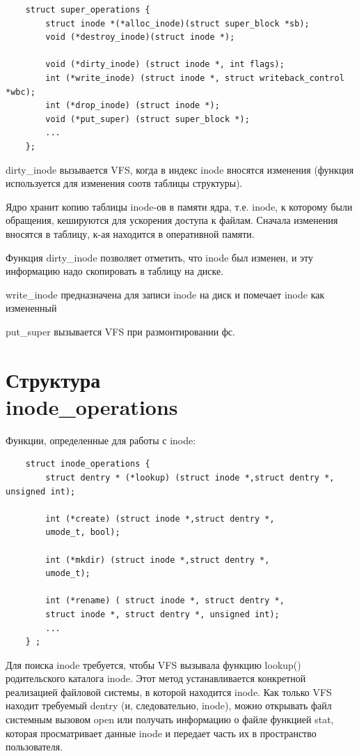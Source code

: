 \begin{lstlisting}
	struct super_operations {
		struct inode *(*alloc_inode)(struct super_block *sb);
		void (*destroy_inode)(struct inode *);
		
		void (*dirty_inode) (struct inode *, int flags);
		int (*write_inode) (struct inode *, struct writeback_control *wbc);
		int (*drop_inode) (struct inode *);
		void (*put_super) (struct super_block *);
		...
	};
\end{lstlisting}

dirty\_inode вызывается VFS, когда в индекс inode вносятся изменения (функция используется для изменения соотв таблицы структуры).

Ядро хранит копию таблицы inode-ов в памяти ядра, т.е. inode, к которому были обращения, кешируются для ускорения доступа к файлам. Сначала изменения вносятся в таблицу, к-ая находится в оперативной памяти.

Функция dirty\_inode позволяет отметить, что inode был изменен, и эту информацию надо скопировать в таблицу на диске.

write\_inode предназначена для записи inode на диск и помечает inode как измененный

put\_super вызывается VFS при размонтировании фс.


\section{Структура \\ inode\_operations}
Функции, определенные для работы с inode:
\begin{lstlisting}
	struct inode_operations {
		struct dentry * (*lookup) (struct inode *,struct dentry *, unsigned int);
		
		int (*create) (struct inode *,struct dentry *,
		umode_t, bool);
		
		int (*mkdir) (struct inode *,struct dentry *,
		umode_t);
		
		int (*rename) ( struct inode *, struct dentry *,
		struct inode *, struct dentry *, unsigned int);
		...
	} ;
\end{lstlisting}

Для поиска inode требуется, чтобы VFS вызывала функцию lookup() родительского каталога inode. Этот метод устанавливается конкретной реализацией файловой системы, в которой находится inode. Как только VFS находит требуемый dentry (и, следовательно, inode), можно открывать файл системным вызовом open или получать информацию о файле функцией stat, которая просматривает данные inode и передает часть их в пространство пользователя.


